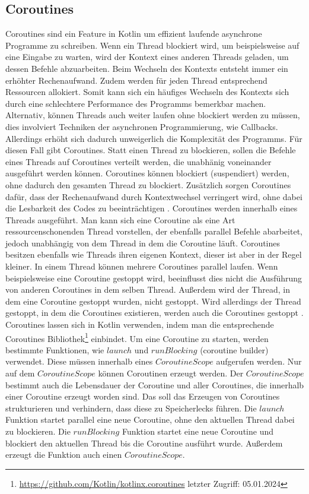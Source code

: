 \documentclass{article}
\begin{document}
\subsection{Coroutines}
Coroutines sind ein Feature in Kotlin um effizient laufende asynchrone Programme zu schreiben. Wenn ein Thread blockiert wird, um beispielsweise auf eine Eingabe zu warten, wird der Kontext eines anderen Threads geladen, um dessen Befehle abzuarbeiten. Beim Wechseln des Kontexts entsteht immer ein erhöhter Rechenaufwand. Zudem werden für jeden Thread entsprechend Ressourcen allokiert. Somit kann sich ein häufiges Wechseln des Kontexts sich durch eine schlechtere Performance des Programms bemerkbar machen. Alternativ, können Threads auch weiter laufen ohne blockiert werden zu müssen, dies involviert Techniken der asynchronen Programmierung, wie Callbacks. Allerdings erhöht sich dadurch unweigerlich die Komplexität des Programms. Für diesen Fall gibt Coroutines. Statt einen Thread zu blockieren, sollen die Befehle eines Threads auf Coroutines verteilt werden, die unabhänig voneinander ausgeführt werden können. Coroutines können blockiert (suspendiert) werden, ohne dadurch den gesamten Thread zu blockiert. Zusätzlich sorgen Coroutines dafür, dass der Rechenaufwand durch Kontextwechsel verringert wird, ohne dabei die Lesbarkeit des Codes zu beeinträchtigen \cite{Kotlin_In-D}. \newline
Coroutines werden innerhalb eines Threads ausgeführt. Man kann sich eine Coroutine als eine Art ressourcenschonenden Thread vorstellen, der ebenfalls parallel Befehle abarbeitet, jedoch unabhängig von dem Thread in dem die Coroutine läuft. Coroutines besitzen ebenfalls wie Threads ihren eigenen Kontext, dieser ist aber in der Regel kleiner. In einem Thread können mehrere Coroutines parallel laufen. Wenn beispielsweise eine Coroutine gestoppt wird, beeinflusst dies nicht die Ausführung von anderen Coroutines in dem selben Thread. Außerdem  wird der Thread, in dem eine Coroutine gestoppt wurden, nicht gestoppt. Wird allerdings der Thread gestoppt, in dem die Coroutines existieren, werden auch die Coroutines gestoppt \cite{KotlinLangDocCoroutines}. \newline
Coroutines lassen sich in Kotlin verwenden, indem man die entsprechende Coroutines Bibliothek\footnote{\url{https://github.com/Kotlin/kotlinx.coroutines} letzter Zugriff: 05.01.2024} einbindet.  Um eine Coroutine zu starten, werden bestimmte Funktionen, wie $launch$ und $runBlocking$ (coroutine builder) verwendet. Diese müssen innerhalb eines $CoroutineScope$ aufgerufen werden. Nur auf dem $CoroutineScope$ können Coroutinen erzeugt werden. Der $CoroutineScope$ bestimmt auch die Lebensdauer der Coroutine und aller Coroutines, die innerhalb einer Coroutine erzeugt worden sind.  Das soll das Erzeugen von Coroutines strukturieren und verhindern, dass diese zu Speicherlecks führen.  Die $launch$ Funktion startet parallel eine neue Coroutine, ohne den aktuellen Thread dabei zu blockieren. Die $runBlocking$ Funktion startet eine neue Coroutine und blockiert den aktuellen Thread bis die Coroutine ausführt wurde. Außerdem erzeugt die Funktion auch einen $CoroutineScope$.
\end{document}
